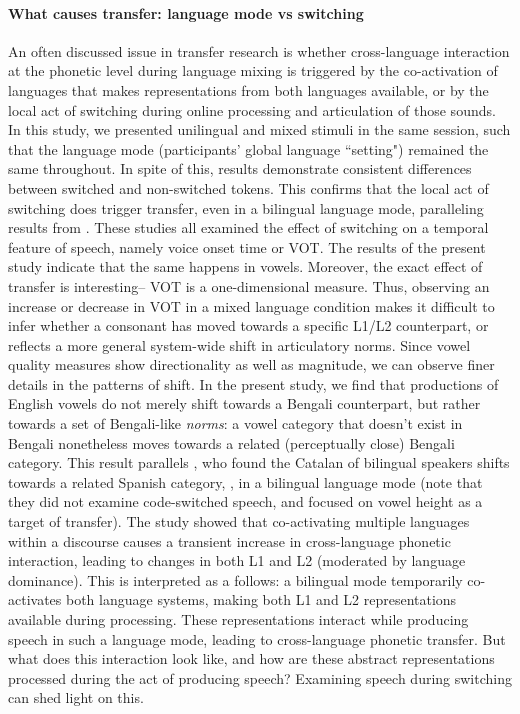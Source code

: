 \documentclass[12 pt]{article}
\newcommand{\nt}[1]{\textipa{[#1]}} %
\begin{document}
\paragraph{\textbf{What causes transfer: language mode vs switching}}
An often discussed issue in transfer research is whether cross-language interaction at the phonetic level during language mixing is triggered by the co-activation of languages that makes representations from both languages available, or by the local act of switching during online processing and articulation of those sounds. In this study, we presented unilingual and mixed stimuli in the same session, such that the language mode (participants' global language ``setting") remained the same throughout. In spite of this, results demonstrate consistent differences between switched and non-switched tokens. This confirms that the local act of switching does trigger transfer, even in a bilingual language mode, paralleling results from \cite{olson2016role, tsui2019impact, piccinini2015voice}. These studies all examined the effect of switching on a temporal feature of speech, namely voice onset time or VOT. The results of the present study indicate that the same happens in vowels. Moreover, the exact effect of transfer is interesting-- VOT is a one-dimensional measure. Thus, observing an increase or decrease in VOT in a mixed language condition makes it difficult to infer whether a consonant has moved towards a specific L1/L2 counterpart, or reflects a more general system-wide shift in articulatory norms. Since vowel quality measures show directionality as well as magnitude, we can observe finer details in the patterns of shift. In the present study, we find that productions of English vowels do not merely shift towards a Bengali counterpart, but rather towards a set of Bengali-like \textit{norms}: a vowel category that doesn't exist in Bengali nonetheless moves towards a related (perceptually close) Bengali category. This result parallels \cite{simonet2014phonetic}, who found the Catalan \nt{O} of bilingual speakers shifts towards a related Spanish category, \nt{o}, in a bilingual language mode (note that they did not examine code-switched speech, and focused on vowel height as a target of transfer). The study showed that co-activating multiple languages within a discourse causes a transient increase in cross-language phonetic interaction, leading to changes in both L1 and L2 (moderated by language dominance). This is interpreted as a follows: a bilingual mode temporarily co-activates both language systems, making both L1 and L2 representations available during processing. These representations interact while producing speech in such a language mode, leading to cross-language phonetic transfer. But what does this interaction look like, and how are these abstract representations processed during the act of producing speech? Examining speech during switching can shed light on this.
\end{document}
